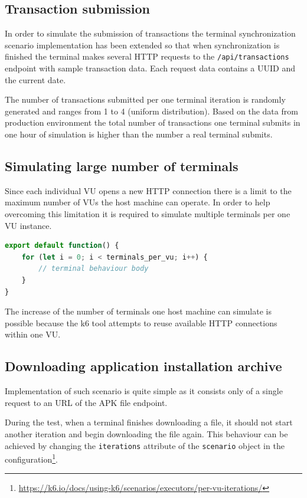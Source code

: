 \documentclass[12pt, a4paper]{article}
\begin{document}
\subsection{Transaction submission}
In order to simulate the submission of transactions the terminal synchronization scenario implementation has been extended so that when synchronization is finished the terminal makes several HTTP requests to the \texttt{/api/transactions} endpoint with sample transaction data.
Each request data contains a UUID and the current date.

The number of transactions submitted per one terminal iteration is randomly generated and ranges from 1 to 4 (uniform distribution).
Based on the data from production environment the total number of transactions one terminal submits in one hour of simulation is higher than the number a real terminal submits.

\subsection{Simulating large number of terminals}

Since each individual VU opens a new HTTP connection there is a limit to the maximum number of VUs the host machine can operate.
In order to help overcoming this limitation it is required to simulate multiple terminals per one VU instance.

\begin{lstlisting}[language=JavaScript, caption={Multiple terminals per one VU},captionpos=b]
export default function() {
    for (let i = 0; i < terminals_per_vu; i++) {
        // terminal behaviour body
    }
}
\end{lstlisting}

The increase of the number of terminals one host machine can simulate is possible because the k6 tool attempts to reuse available HTTP connections within one VU.

\subsection{Downloading application installation archive}
Implementation of such scenario is quite simple as it consists only of a single request to an URL of the APK file endpoint.

During the test, when a terminal finishes downloading a file, it should not start another iteration and begin downloading the file again.
This behaviour can be achieved by changing the \texttt{iterations} attribute of the \texttt{scenario} object in the configuration\footnote{\url{https://k6.io/docs/using-k6/scenarios/executors/per-vu-iterations/}}.
\end{document}
